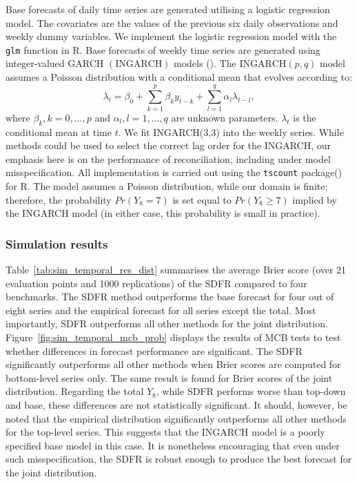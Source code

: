 \documentclass[a4paper,review,12pt,authoryear]{elsarticle}
\let\code=\texttt
\let\proglang=\textsf
\theoremstyle{definition}
\begin{document}
     Base forecasts of daily time series are generated utilising a logistic regression model. The covariates are the values of the previous six daily observations and weekly dummy variables. We implement the logistic regression model with the \code{glm} function in \proglang{R}. Base forecasts of weekly time series are generated using integer-valued GARCH $(\textrm{INGARCH})$ models (). The $\textrm{INGARCH}(p, q)$ model assumes a Poisson distribution with a conditional mean that evolves according to:
     \[
      \lambda_t = \beta_0 + \sum_{k=1}^p \beta_ky_{t-k} + \sum_{l=1}^q \alpha_l\lambda_{t-l}, 
     \] where $\beta_k, k=0,\dots,p$ and $\alpha_l, l=1,\dots,q$ are unknown parameters. $\lambda_t$ is the conditional mean at time $t$.  We fit INGARCH(3,3) into the weekly series. While methods could be used to select the correct lag order for the INGARCH, our emphasis here is on the performance of reconciliation, including under model misspecification. All implementation is carried out using the \code{tscount} package() for \proglang{R}. The model assumes a Poisson distribution, while our domain is finite; therefore, the probability $Pr(Y_8=7)$ is set equal to $Pr(Y_8\geq 7)$ implied by the INGARCH model (in either case, this probability is small in practice).


     \subsubsection{Simulation results}
     Table~\ref{tab:sim_temporal_res_dist} summarises the average Brier score (over 21 evaluation points and 1000 replications) of the SDFR compared to four benchmarks.
     The SDFR method outperforms the base forecast for four out of eight series and the empirical forecast for all series except the total. Most importantly, SDFR outperforms all other methods for the joint distribution.      Figure~\ref{fig:sim_temporal_mcb_prob} displays the results of MCB tests to test whether differences in forecast performance are significant. The SDFR significantly outperforms all other methods when Brier scores are computed for bottom-level series only. The same result is found for Brier scores of the joint distribution. Regarding the total $Y_8$, while SDFR performs worse than top-down and base, these differences are not statistically significant. It should, however, be noted that the empirical distribution significantly outperforms all other methods for the top-level series. This suggests that the INGARCH model is a poorly specified base model in this case. It is nonetheless encouraging that even under such misspecification, the SDFR is robust enough to produce the best forecast for the joint distribution.
     
\end{document}

